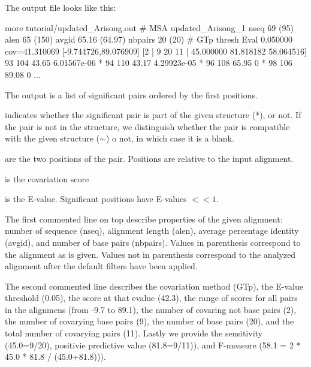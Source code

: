 The  output file looks like this:

\begin{sreoutput}
more tutorial/updated_Arisong.out 
# MSA updated_Arisong_1 nseq 69 (95) alen 65 (150) avgid 65.16 (64.97) nbpairs 20 (20)
# GTp thresh Eval 0.050000 cov=41.310069 [-9.744726,89.076909] [2 | 9 20 11 | 45.000000 81.818182 58.064516] 
                93             104      43.65   6.01567e-06
*               94             110      43.17   4.29923e-05
*               96             108      65.95   0
*               98             106      89.08   0
...
\end{sreoutput}
The output is a list of significant pairs ordered by the first positions. \\

\begin{sreitems}{}
\item[\emprog{First column}] indicates whether the significant pair is
  part of the given structure (*), or not.  If the pair is not in the
  structure, we distinguish whether the pair is compatible with the
  given structure ($\sim$) o not, in which case it is a blank.

\item[\emprog{Second and third columns}] are the two positions of the
  pair. Positions are relative to the input alignment.

\item[\emprog{Forth column}] is the covariation score

\item[\emprog{Fifth column}] is the E-value. Significant positions
  have E-values $<< 1$.
\end{sreitems}

The first commented line on top describe properties of the given
alignment: number of sequence (nseq), alignment length (alen), average
percentage identity (avgid), and number of base pairs (nbpairs).
Values in parenthesis correspond to the alignment as is given. Values
not in parenthesis correspond to the analyzed alignment after the
default filters have been applied.

The second commented line describes the covariation method (GTp), the
E-value threshold (0.05), the score at that evalue (42.3), the range
of scores for all pairs in the alignmens (from -9.7 to 89.1), the
number of covaring not base pairs (2), the number of covarying base
pairs (9), the number of base pairs (20), and the total number of
covarying pairs (11). Lastly we provide the sensitivity (45.0=9/20),
positivie predictive value (81.8=9/11)), and F-measure (58.1 = 2 *
45.0 * 81.8 / (45.0+81.8))).\\

